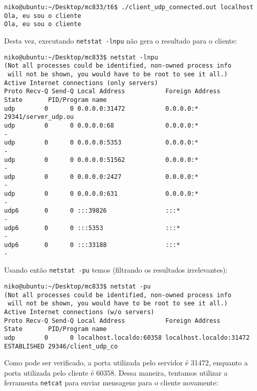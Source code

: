 \documentclass[a4paper,10pt]{article}
\begin{document}
\begin{lstlisting}
niko@ubuntu:~/Desktop/mc833/t6$ ./client_udp_connected.out localhost
Ola, eu sou o cliente
Ola, eu sou o cliente

\end{lstlisting}

Desta vez, executando {\tt netstat -lnpu} não gera o resultado para o cliente:

\begin{lstlisting}
niko@ubuntu:~/Desktop/mc833$ netstat -lnpu
(Not all processes could be identified, non-owned process info
 will not be shown, you would have to be root to see it all.)
Active Internet connections (only servers)
Proto Recv-Q Send-Q Local Address           Foreign Address         State       PID/Program name
udp        0      0 0.0.0.0:31472           0.0.0.0:*                           29341/server_udp.ou
udp        0      0 0.0.0.0:68              0.0.0.0:*                           -               
udp        0      0 0.0.0.0:5353            0.0.0.0:*                           -               
udp        0      0 0.0.0.0:51562           0.0.0.0:*                           -               
udp        0      0 0.0.0.0:2427            0.0.0.0:*                           -               
udp        0      0 0.0.0.0:631             0.0.0.0:*                           -               
udp6       0      0 :::39826                :::*                                -               
udp6       0      0 :::5353                 :::*                                -               
udp6       0      0 :::33188                :::*                                -               

\end{lstlisting}

Usando então {\tt netstat -pu} temos (filtrando os resultados irrelevantes):

\begin{lstlisting}
niko@ubuntu:~/Desktop/mc833$ netstat -pu
(Not all processes could be identified, non-owned process info
 will not be shown, you would have to be root to see it all.)
Active Internet connections (w/o servers)
Proto Recv-Q Send-Q Local Address           Foreign Address         State       PID/Program name
udp        0      0 localhost.localdo:60358 localhost.localdo:31472 ESTABLISHED 29346/client_udp_co

\end{lstlisting}

Como pode ser verificado, a porta utilizada pelo servidor é 31472, enquanto a porta utilizada pelo cliente é 60358. Dessa maneira, tentamos utilizar a ferramenta {\tt netcat} para enviar mensagens para o cliente novamente:
\end{document}
